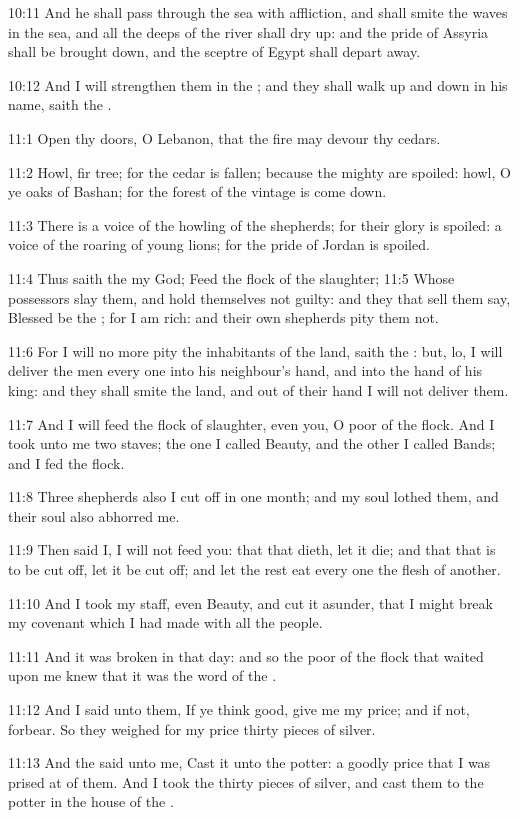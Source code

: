 10:11 And he shall pass through the sea with affliction, and shall
smite the waves in the sea, and all the deeps of the river shall dry
up: and the pride of Assyria shall be brought down, and the sceptre of
Egypt shall depart away.

10:12 And I will strengthen them in the \LORD; and they shall walk up
and down in his name, saith the \LORD.

11:1 Open thy doors, O Lebanon, that the fire may devour thy cedars.

11:2 Howl, fir tree; for the cedar is fallen; because the mighty are
spoiled: howl, O ye oaks of Bashan; for the forest of the vintage is
come down.

11:3 There is a voice of the howling of the shepherds; for their glory
is spoiled: a voice of the roaring of young lions; for the pride of
Jordan is spoiled.

11:4 Thus saith the \LORD my God; Feed the flock of the slaughter; 11:5
Whose possessors slay them, and hold themselves not guilty: and they
that sell them say, Blessed be the \LORD; for I am rich: and their own
shepherds pity them not.

11:6 For I will no more pity the inhabitants of the land, saith the
\LORD: but, lo, I will deliver the men every one into his neighbour's
hand, and into the hand of his king: and they shall smite the land,
and out of their hand I will not deliver them.

11:7 And I will feed the flock of slaughter, even you, O poor of the
flock. And I took unto me two staves; the one I called Beauty, and the
other I called Bands; and I fed the flock.

11:8 Three shepherds also I cut off in one month; and my soul lothed
them, and their soul also abhorred me.

11:9 Then said I, I will not feed you: that that dieth, let it die;
and that that is to be cut off, let it be cut off; and let the rest
eat every one the flesh of another.

11:10 And I took my staff, even Beauty, and cut it asunder, that I
might break my covenant which I had made with all the people.

11:11 And it was broken in that day: and so the poor of the flock that
waited upon me knew that it was the word of the \LORD.

11:12 And I said unto them, If ye think good, give me my price; and if
not, forbear. So they weighed for my price thirty pieces of silver.

11:13 And the \LORD said unto me, Cast it unto the potter: a goodly
price that I was prised at of them. And I took the thirty pieces of
silver, and cast them to the potter in the house of the \LORD.

